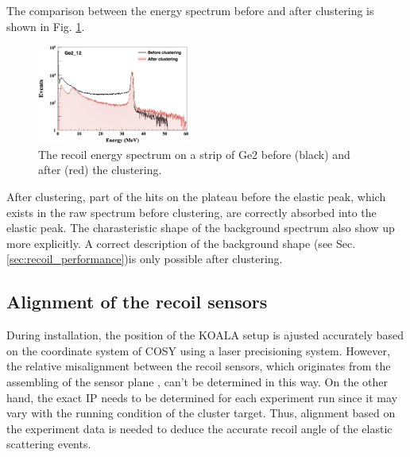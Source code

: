 \documentclass[number,5p]{elsarticle}
\begin{document}
The comparison between the energy spectrum before and after clustering is shown in
Fig. \ref{fig:clustering}.
\begin{figure}[h]
  \centering
  \includegraphics[width=0.45\textwidth]{./clustering.png}
  \caption{The recoil energy spectrum on a strip of Ge2 before (black) and after (red) the clustering.}
  \label{fig:clustering}
\end{figure}
After clustering, part of the hits on the plateau before the elastic peak, which exists in the raw spectrum before clustering, are correctly absorbed into the elastic peak.
The charasteristic shape of the background spectrum also show up more explicitly.
A correct description of the background shape (see Sec. \ref{sec:recoil_performance})is only possible after clustering.

\subsection{Alignment of the recoil sensors}
\label{sec:alignment}

During installation, the position of the KOALA setup is ajusted accurately based on the
coordinate system of COSY using a laser precisioning system.
However, the relative misalignment between the recoil sensors, which originates from the assembling of the sensor plane , can't be determined in this way.
On the other hand, the exact IP needs to be determined for each experiment run
since it may vary with the running condition of the cluster target.
Thus, alignment based on the experiment data is needed to deduce the accurate recoil angle of the elastic scattering events.
\end{document}
